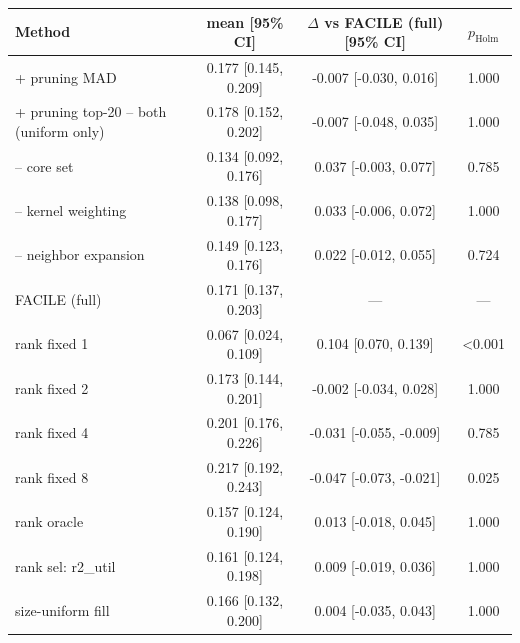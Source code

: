 \begin{tabular}{lccc}
\toprule
Method & mean [95\% CI] & $\Delta$ vs FACILE (full) [95\% CI] & $p_{\mathrm{Holm}}$ \\
\midrule
+ pruning MAD & 0.177 [0.145, 0.209] & -0.007 [-0.030, 0.016] & 1.000 \\
+ pruning top-20%
-- both (uniform only) & 0.178 [0.152, 0.202] & -0.007 [-0.048, 0.035] & 1.000 \\
-- core set & 0.134 [0.092, 0.176] & 0.037 [-0.003, 0.077] & 0.785 \\
-- kernel weighting & 0.138 [0.098, 0.177] & 0.033 [-0.006, 0.072] & 1.000 \\
-- neighbor expansion & 0.149 [0.123, 0.176] & 0.022 [-0.012, 0.055] & 0.724 \\
FACILE (full) & 0.171 [0.137, 0.203] & --- & --- \\
rank fixed 1 & 0.067 [0.024, 0.109] & 0.104 [0.070, 0.139] & <0.001 \\
rank fixed 2 & 0.173 [0.144, 0.201] & -0.002 [-0.034, 0.028] & 1.000 \\
rank fixed 4 & 0.201 [0.176, 0.226] & -0.031 [-0.055, -0.009] & 0.785 \\
rank fixed 8 & 0.217 [0.192, 0.243] & -0.047 [-0.073, -0.021] & 0.025 \\
rank oracle & 0.157 [0.124, 0.190] & 0.013 [-0.018, 0.045] & 1.000 \\
rank sel: r2_util & 0.161 [0.124, 0.198] & 0.009 [-0.019, 0.036] & 1.000 \\
size-uniform fill & 0.166 [0.132, 0.200] & 0.004 [-0.035, 0.043] & 1.000 \\
\bottomrule
\end{tabular}

